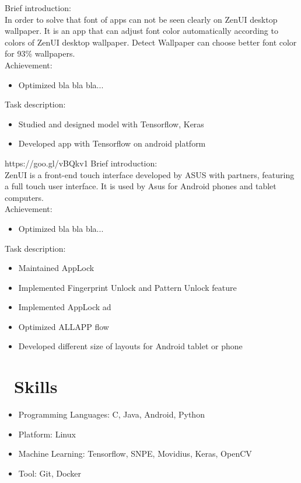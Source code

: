 \documentclass{resume}
\begin{document}
 {}
Brief introduction:\\
In order to solve that font of apps can not be seen clearly on ZenUI desktop wallpaper. It is an app that can adjust font color automatically according to colors of ZenUI desktop wallpaper. Detect Wallpaper can choose better font color for 93\% wallpapers.\\
Achievement:
\begin{itemize}
  \item Optimized bla bla bla...
\end{itemize}
Task description:
\begin{itemize}
  \item Studied and designed model with Tensorflow, Keras
  \item Developed app with Tensorflow on android platform 
\end{itemize}

 {https://goo.gl/vBQkv1}
Brief introduction:\\
ZenUI is a front-end touch interface developed by ASUS with partners, featuring a full touch user interface. It is used by Asus for Android phones and tablet computers.\\
Achievement:
\begin{itemize}
  \item Optimized bla bla bla...
\end{itemize}
Task description:
\begin{itemize}
  \item Maintained AppLock
  \item Implemented Fingerprint Unlock and Pattern Unlock feature
  \item Implemented AppLock ad
  \item Optimized ALLAPP flow
  \item Developed different size of layouts for Android tablet or phone
\end{itemize}

\section{\faCogs\ Skills}
\begin{itemize}[parsep=0.5ex]
  \item Programming Languages: C, Java, Android, Python
  \item Platform: Linux
  \item Machine Learning: Tensorflow, SNPE, Movidius, Keras, OpenCV
  \item Tool: Git, Docker
\end{itemize}
\end{document}

